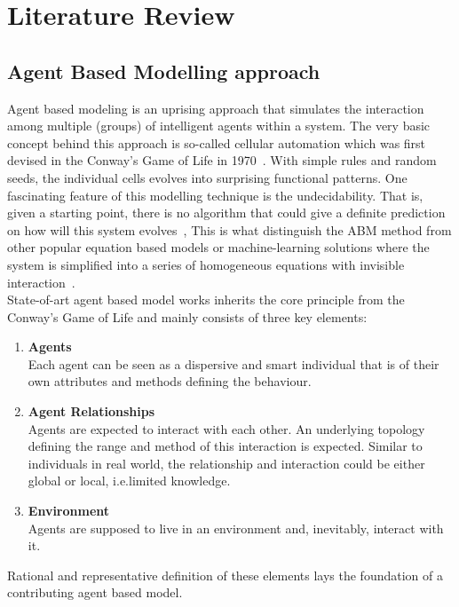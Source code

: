 \documentclass[12pt,twoside]{report}
\begin{document}
	
	
	
	\chapter{Literature Review}\label{ch:literature-review}
	
	
	\section{Agent Based Modelling approach}\label{sec:agent-based-modelling-approach}
	Agent based modeling is an uprising approach that simulates the interaction
	among multiple (groups) of intelligent agents within a system.
	The very basic concept behind this approach is so-called cellular automation
	which was first devised in the Conway's Game of Life in 1970~\cite{Conway1970}.
	With simple rules and random seeds, the individual cells evolves into surprising
	functional patterns.
	One fascinating feature of this modelling technique is the undecidability.
	That is, given a starting point, there is no algorithm that could give a definite
	prediction on how will this system evolves~\cite{golomb1983elwyn},
	This is what distinguish the ABM method from other popular equation based
	models or machine-learning solutions where the system is simplified into a series of
	homogeneous equations with invisible interaction~\cite{sun2005survey,ABMEqu1998}.\\
	
	State-of-art agent based model works inherits the core principle from the Conway's
	Game of Life and mainly consists of three key elements\cite{macal2014introductory}:
	\begin{enumerate}
		\item \textbf{Agents}\\
		Each agent can be seen as a dispersive and smart individual that is of
		their own attributes and methods defining the behaviour.
		\item \textbf{Agent Relationships}\\
		Agents are expected to interact with each other.
		An underlying topology defining the range and method of this interaction
		is expected.
		Similar to individuals in real world, the relationship and interaction
		could be either global or local, i.e.limited knowledge.
		\item \textbf{Environment}\\
		Agents are supposed to live in an environment and, inevitably, interact
		with it.
	\end{enumerate}
	Rational and representative definition of these elements lays the foundation
	of a contributing agent based model.
	\clearpage
	
\end{document}
